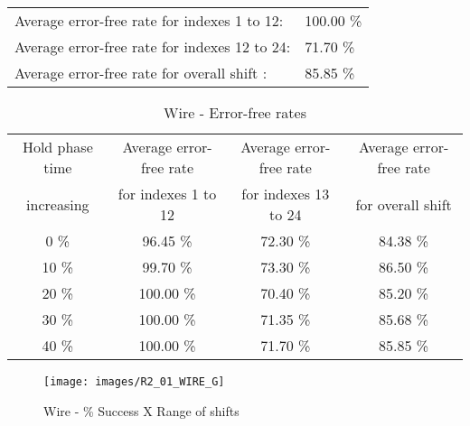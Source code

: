 \begin{table}[h]
\begin{center}
\begin{tabular}{|c|c|c|c|c|}
\end{tabular}


\flushleft
\begin{tabular}{l l}
Average error-free rate for indexes  1 to 12: & 100.00 \% \\
Average error-free rate for indexes 12 to 24: &  71.70 \% \\
Average error-free rate for overall shift   : &  85.85 \% \\

\end{tabular}


\end{center}
\end{table}



\begin{table}[h]
\begin{center}
\caption{Wire - Error-free rates}
\begin{tabular}{|c|c|c|c|}
\hline
Hold phase time   & Average error-free rate  & Average error-free rate  & Average error-free rate  \\
increasing & for indexes  1 to 12 & for indexes 13 to 24 & for overall shift \\
\hline
0  \% &  96.45 \% & 72.30 \% & 84.38 \% \\
\hline
10 \% &  99.70 \% & 73.30 \% & 86.50 \% \\
\hline
20 \% & 100.00 \% & 70.40 \% & 85.20 \% \\
\hline
30 \% & 100.00 \% & 71.35 \% & 85.68 \% \\
\hline
40 \% & 100.00 \% & 71.70 \% & 85.85 \% \\
\hline


\end{tabular}

\end{center}
\end{table}


\pagebreak
\begin{figure}[h!]
\center
\texttt{[image: images/R2\_01\_WIRE\_G]}
\caption{Wire -  \% Success X Range of shifts}
\label{figure:wire_reg_gt1}
\end{figure}

